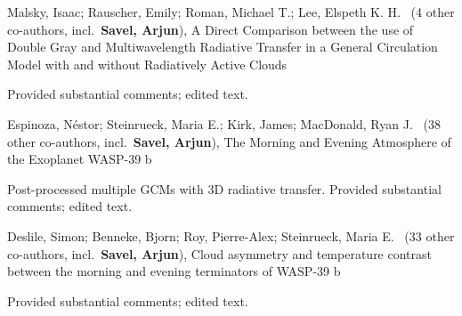 


\item[{\color{numcolor}\scriptsize3}] Malsky, Isaac; Rauscher, Emily; Roman, Michael T.; Lee, Elspeth K. H. \etal\ ({4} other co-authors, incl.\ \textbf{Savel, Arjun}), A Direct Comparison between the use of Double Gray and Multiwavelength Radiative Transfer in a General Circulation Model with and without Radiatively Active Clouds

Provided substantial comments; edited text.

\item[{\color{numcolor}\scriptsize2}] Espinoza, Néstor; Steinrueck, Maria E.; Kirk, James; MacDonald, Ryan J. \etal\ ({38} other co-authors, incl.\ \textbf{Savel, Arjun}), The Morning and Evening Atmosphere of the
Exoplanet WASP-39 b

Post-processed multiple GCMs with 3D radiative transfer. Provided substantial comments; edited text. 

\item[{\color{numcolor}\scriptsize1}] Deslile, Simon; Benneke, Bjorn; Roy, Pierre-Alex; Steinrueck, Maria E. \etal\ ({33} other co-authors, incl.\ \textbf{Savel, Arjun}), Cloud asymmetry and temperature contrast between the morning and evening terminators of WASP-39 b

Provided substantial comments; edited text.
